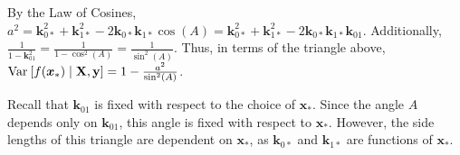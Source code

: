 \documentclass[11pt]{article}
\numberwithin{figure}{section}
\numberwithin{equation}{section}
\def\BayesOpt{\texttt{BayesOpt}}
\newcommand{\bs}[1]{\boldsymbol{#1}}
\def\bsx{\bs{x}}
\def\bsk{\bs{k}}
\def\xast{\bsx_{*}}
\begin{document}
\vspace*{1.0cm}
\begin{center}
\end{center}

By the Law of Cosines, $a^2 = \bsk_{0*}^2 + \bsk_{1*}^{2} - 2\bsk_{0*}\bsk_{1*}\cos(A) = \bsk_{0*}^2 + \bsk_{1*}^{2} - 2\bsk_{0*}\bsk_{1*}\bsk_{01}$. Additionally, $\frac{1}{1 - \bsk_{01}^{2}} = \frac{1}{1 - \cos^{2}(A)} = \frac{1}{\sin^{2}(A)}$. Thus, in terms of the triangle above, $\var{f(\xast) \mid \mathbf{X}, \mathbf{y}} = 1 - \frac{a^2}{\sin^2(A)}$.

Recall that $\bsk_{01}$ is fixed with respect to the choice of $\xast$. Since the angle $A$ depends only on $\bsk_{01}$, this angle is fixed with respect to $\xast$. However, the side lengths of this triangle are dependent on $\xast$, as $\bsk_{0*}$ and $\bsk_{1*}$ are functions of $\xast$. 
\end{document}
